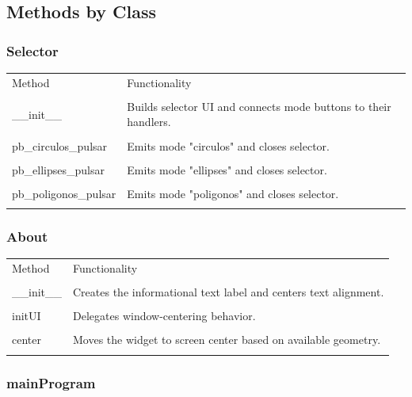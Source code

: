 ﻿\documentclass[11pt,a4paper]{article}
\begin{document}
\subsection*{Methods by Class}

\subsubsection*{Selector}

\begin{longtable}{|p{}|p{}|}
\hline
Method & Functionality \\\\
\hline
\_\_init\_\_ & Builds selector UI and connects mode buttons to their handlers. \\\\
\hline
pb\_circulos\_pulsar & Emits mode "circulos" and closes selector. \\\\
\hline
pb\_ellipses\_pulsar & Emits mode "ellipses" and closes selector. \\\\
\hline
pb\_poligonos\_pulsar & Emits mode "poligonos" and closes selector. \\\\
\hline
\end{longtable}


\subsubsection*{About}

\begin{longtable}{|p{}|p{}|}
\hline
Method & Functionality \\\\
\hline
\_\_init\_\_ & Creates the informational text label and centers text alignment. \\\\
\hline
initUI & Delegates window-centering behavior. \\\\
\hline
center & Moves the widget to screen center based on available geometry. \\\\
\hline
\end{longtable}


\subsubsection*{mainProgram}
\end{document}
